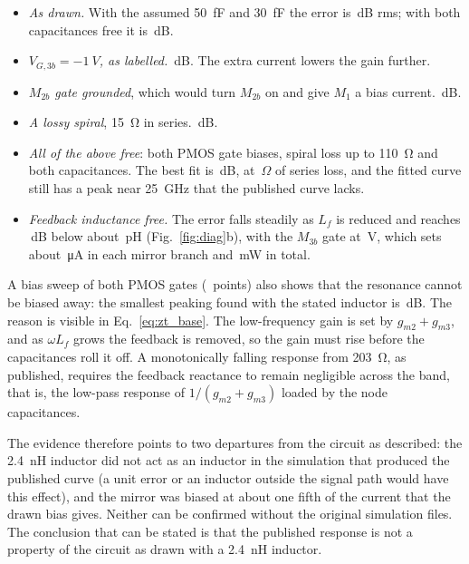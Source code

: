 \documentclass[11pt,a4paper]{article}
\begin{document}
\begin{itemize}
\item \emph{As drawn.} With the assumed \SI{50}{fF} and \SI{30}{fF} the error is \DgRmsDrawn\,dB rms; with both capacitances free it is \DgRmsFitDrawn\,dB.
\item \emph{$V_{G,3b}=\SI{-1}{V}$, as labelled.} \DgRmsMOne\,dB. The extra current lowers the gain further.
\item \emph{$M_{2b}$ gate grounded}, which would turn $M_{2b}$ on and give $M_1$ a bias current. \DgRmsMTwoB\,dB.
\item \emph{A lossy spiral}, \SI{15}{\ohm} in series. \DgRmsLoss\,dB.
\item \emph{All of the above free}: both PMOS gate biases, spiral loss up to \SI{110}{\ohm} and both capacitances. The best fit is \DgRmsBestL\,dB, at \DgRsBestL\,$\Omega$ of series loss, and the fitted curve still has a peak near \SI{25}{GHz} that the published curve lacks.
\item \emph{Feedback inductance free.} The error falls steadily as $L_f$ is reduced and reaches \DgRmsNoL\,dB below about \DgLfMax\,pH (Fig.~\ref{fig:diag}b), with the $M_{3b}$ gate at \DgVgNoL\,V, which sets about \DgIdNoL\,\si{\micro A} in each mirror branch and \DgPwrNoL\,mW in total.
\end{itemize}

A bias sweep of both PMOS gates (\DgNScreen\ points) also shows that the resonance cannot be biased away: the smallest peaking found with the stated inductor is \DgPkMin\,dB. The reason is visible in Eq.~\eqref{eq:zt_base}. The low-frequency gain is set by $g_{m2}+g_{m3}$, and as $\omega L_f$ grows the feedback is removed, so the gain must rise before the capacitances roll it off. A monotonically falling response from \SI{203}{\ohm}, as published, requires the feedback reactance to remain negligible across the band, that is, the low-pass response of $1/(g_{m2}+g_{m3})$ loaded by the node capacitances.

The evidence therefore points to two departures from the circuit as described: the \SI{2.4}{nH} inductor did not act as an inductor in the simulation that produced the published curve (a unit error or an inductor outside the signal path would have this effect), and the mirror was biased at about one fifth of the current that the drawn bias gives. Neither can be confirmed without the original simulation files. The conclusion that can be stated is that the published response is not a property of the circuit as drawn with a \SI{2.4}{nH} inductor.
\end{document}
